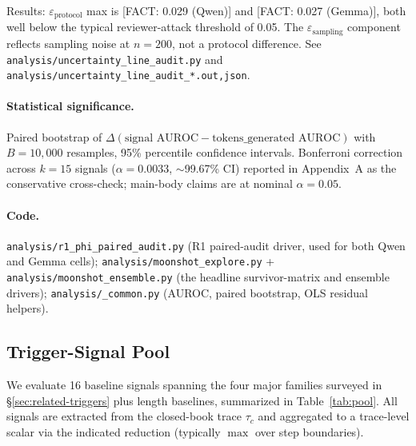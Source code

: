 \documentclass[11pt]{article}
\newcommand{\FACT}[1]{{\color{blue}\textsf{[FACT: #1]}}}
\begin{document}
\noindent Results: $\varepsilon_{\text{protocol}}$ max is
\FACT{0.029 (Qwen)} and \FACT{0.027 (Gemma)}, both well below the typical
reviewer-attack threshold of 0.05. The $\varepsilon_{\text{sampling}}$
component reflects sampling noise at $n{=}200$, not a protocol difference. See
\texttt{analysis/uncertainty\_line\_audit.py} and
\texttt{analysis/uncertainty\_line\_audit\_*.{out,json}}.

\paragraph{Statistical significance.} Paired bootstrap of
$\Delta(\text{signal AUROC} - \text{tokens\_generated AUROC})$ with $B{=}10{,}000$
resamples, 95\% percentile confidence intervals. Bonferroni correction across
$k{=}15$ signals ($\alpha = 0.0033$, $\sim$99.67\% CI) reported in
Appendix~A as the conservative cross-check; main-body claims are at nominal
$\alpha=0.05$.


\paragraph{Code.}
\texttt{analysis/r1\_phi\_paired\_audit.py} (R1 paired-audit driver, used
for both Qwen and Gemma cells);
\texttt{analysis/moonshot\_explore.py} +
\texttt{analysis/moonshot\_ensemble.py} (the headline survivor-matrix and
ensemble drivers);
\texttt{analysis/\_common.py} (AUROC, paired bootstrap, OLS residual helpers).

\subsection{Trigger-Signal Pool}
\label{sec:methods-pool}

We evaluate 16 baseline signals spanning the four major families surveyed in
\S\ref{sec:related-triggers} plus length baselines, summarized in
Table~\ref{tab:pool}. All signals are extracted from the closed-book trace
$\tau_c$ and aggregated to a trace-level scalar via the indicated reduction
(typically $\max$ over step boundaries).
\end{document}
